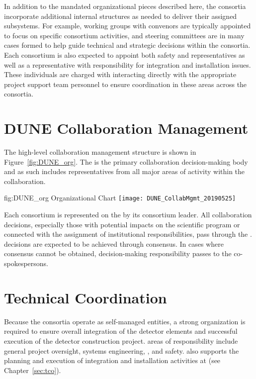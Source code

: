 In addition to the mandated organizational pieces described here, 
the consortia incorporate additional internal structures as needed 
to deliver their assigned subsystems.  For example, working groups 
with convenors are typically appointed to focus on specific consortium 
activities, and steering committees are in many cases formed to help 
guide technical and strategic decisions within the consortia.  Each 
consortium is also expected to appoint both safety and  
representatives as well as a representative with responsibility for 
integration and installation issues.  These individuals are charged 
with interacting directly with the appropriate project support team 
personnel to ensure coordination in these areas across the consortia.        

\section{DUNE Collaboration Management}
\label{sec:dune_mgmt}

The high-level  collaboration management structure is 
shown in Figure~\ref{fig:DUNE_org}.  The   is 
the primary collaboration decision-making body and as such includes 
representatives from all major areas of activity within the 
collaboration.
\begin{dunefigure}{fig:DUNE_org}
  { Organizational Chart}
  \texttt{[image: DUNE\_CollabMgmt\_20190525]}
\end{dunefigure}

Each consortium is represented on the   by its 
consortium leader.  All collaboration decisions, especially those with 
potential impacts on the  scientific program or connected 
with the assignment of institutional responsibilities, pass through the 
.   decisions are expected to be achieved through 
consensus.  In cases where consensus cannot be obtained, decision-making 
responsibility passes to the co-spokespersons.

\section{Technical Coordination}
\label{sec:tc}

Because the consortia operate as self-managed entities, a strong
 organization is required to ensure overall integration 
of the detector elements and successful execution of the detector
construction project.   areas of responsibility include 
general project oversight, systems engineering, , and 
safety.   also supports the planning and execution 
of integration and installation activities at  (see 
Chapter~\ref{sec:tco}).  

